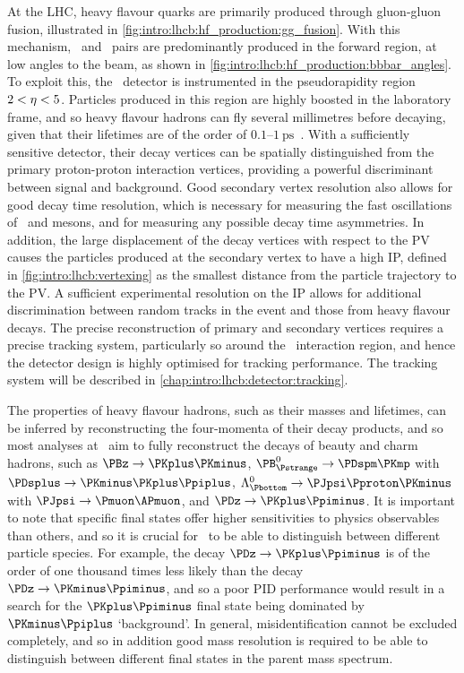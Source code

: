 At the \ac{LHC}, heavy flavour quarks are primarily produced through 
gluon-gluon fusion, illustrated in 
\cref{fig:intro:lhcb:hf_production:gg_fusion}.
With this mechanism, \bbbar\ and \ccbar\ pairs are predominantly produced in 
the forward region, at low angles to the beam, as shown in 
\cref{fig:intro:lhcb:hf_production:bbbar_angles}.
To exploit this, the \lhcb\ detector is instrumented in the pseudorapidity 
region $2 < \eta < 5$.
Particles produced in this region are highly boosted in the laboratory frame, 
and so heavy flavour hadrons can fly several millimetres before decaying, given 
that their lifetimes are of the order of 
$0.1$--$\SI{1}{\pico\second}$~\cite{PDG2014}.
With a sufficiently sensitive detector, their decay vertices can be spatially 
distinguished from the primary proton-proton interaction vertices, providing a 
powerful discriminant between signal and background.
Good secondary vertex resolution also allows for good decay time resolution, 
which is necessary for measuring the fast oscillations of \PBds\ and \PDzero 
mesons, and for measuring any possible decay time asymmetries.
In addition, the large displacement of the decay vertices with respect to the 
\ac{PV} causes the particles produced at the secondary vertex to have a high 
\ac{IP}, defined in \cref{fig:intro:lhcb:vertexing} as the smallest distance 
from the particle trajectory to the \ac{PV}.
A sufficient experimental resolution on the \ac{IP} allows for additional 
discrimination between random tracks in the event and those from heavy flavour 
decays.
The precise reconstruction of primary and secondary vertices requires a precise 
tracking system, particularly so around the \pp\ interaction region, and hence 
the detector design is highly optimised for tracking performance.
The tracking system will be described in 
\cref{chap:intro:lhcb:detector:tracking}.

The properties of heavy flavour hadrons, such as their masses and lifetimes, 
can be inferred by reconstructing the four-momenta of their decay products, and 
so most analyses at \lhcb\ aim to fully reconstruct the decays of beauty and 
charm hadrons, such as $\decay{\PBz}{\PKplus\PKminus}$, 
$\decay{\PBs}{\PDspm\PKmp}$ with $\decay{\PDsplus}{\PKminus\PKplus\Ppiplus}$, 
$\decay{\PLambdab}{\PJpsi\Pproton\PKminus}$ with 
$\decay{\PJpsi}{\Pmuon\APmuon}$, and $\decay{\PDz}{\PKplus\Ppiminus}$.
It is important to note that specific final states offer higher sensitivities 
to physics observables than others, and so it is crucial for \lhcb\ to be able 
to distinguish between different particle species.
For example, the decay $\decay{\PDz}{\PKplus\Ppiminus}$ is of the order of one 
thousand times less likely than the decay $\decay{\PDz}{\PKminus\Ppiminus}$, 
and so a poor \ac{PID} performance would result in a search for the 
$\PKplus\Ppiminus$ final state being dominated by $\PKminus\Ppiplus$ 
`background'.
In general, misidentification cannot be excluded completely, and so in addition 
good mass resolution is required to be able to distinguish between different 
final states in the parent mass spectrum.

